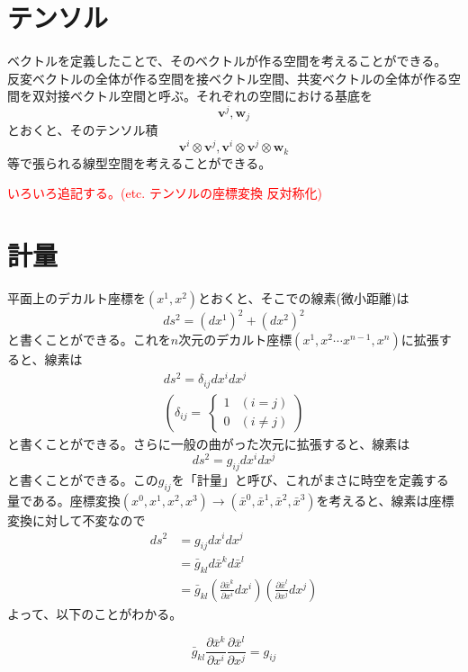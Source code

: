 \documentclass[dvipdfmx]{report} %
\begin{document}
\section{テンソル}
ベクトルを定義したことで、そのベクトルが作る空間を考えることができる。
反変ベクトルの全体が作る空間を接ベクトル空間、共変ベクトルの全体が作る空間を双対接ベクトル空間と呼ぶ。それぞれの空間における基底を
\[ \bm{v}^j, \bm{w}_j \]
とおくと、そのテンソル積
\[ \bm{v}^i \otimes \bm{v}^j, \bm{v}^i \otimes \bm{v}^j \otimes \bm{w}_k \]
等で張られる線型空間を考えることができる。

\textcolor{red}{いろいろ追記する。(etc. テンソルの座標変換 反対称化)}


\section{計量}
平面上のデカルト座標を$(x^1, x^2)$とおくと、そこでの線素(微小距離)は
\[ ds^2 = (dx^1)^2 + (dx^2)^2 \]
と書くことができる。これを$n$次元のデカルト座標$(x^1, x^2 \cdots x^{n-1}, x^n)$に拡張すると、線素は
\begin{equation*}
\begin{split}
	ds^2 = \delta_{ij} dx^i dx^j \\
	\left(
	\delta_{ij} =\
		\begin{cases}
			1 & (i=j)\\
			0 & (i \neq j)
		\end{cases}
	\right)
\end{split}
\end{equation*}
と書くことができる。さらに一般の曲がった次元に拡張すると、線素は
\[ ds^2 = g_{ij} dx^i dx^j \]
と書くことができる。この$g_{ij}$を「計量」と呼び、これがまさに時空を定義する量である。座標変換$(x^0, x^1, x^2, x^3) \rightarrow (\bar{x}^0, \bar{x}^1, \bar{x}^2, \bar{x}^3)$を考えると、線素は座標変換に対して不変なので
\begin{equation*}
\begin{split}
	ds^2 
		&= g_{ij} dx^i dx^j \\
		&= \bar{g}_{kl} d \bar{x}^k d \bar{x}^l\\
		&= \bar{g}_{kl} \left( \frac{\partial \bar{x}^k}{\partial x^i} dx^i \right)\left( \frac{\partial \bar{x}^l}{\partial x^j} dx^j \right)
\end{split}
\end{equation*}
よって、以下のことがわかる。
\begin{tcolorbox}[title=計量$g_{ij}$の変換則]
\[
\bar{g}_{kl} \frac{\partial \bar{x}^k}{\partial x^i} \frac{\partial \bar{x}^l}{\partial x^j} 
= g_{ij}
\]
\end{tcolorbox}
\end{document}
